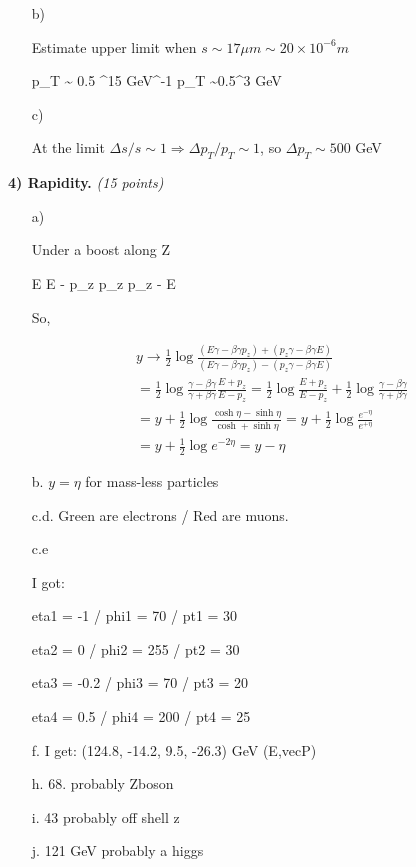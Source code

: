 {\begin{itemize}
{}

\item[b)]{
Estimate upper limit when $s\sim17 \mu m \sim 20 \times 10^{-6} m$

\be
p_T \sim {}  0.5  ^{15} GeV^{-1}
p_T \sim 0.5^3 GeV
\ee

}
\item[c)]{
At the limit $\Delta s / s \sim 1  \Rightarrow \Delta p_T / p_T \sim 1 $, so $\Delta p_T \sim 500$ GeV


}
\end{itemize}

\vspace*{0.25in}

\textbf{4) Rapidity.} \hfill \textit{(15 points)}\\

\begin{itemize}
\item[a)]{
Under a boost along Z

\be
E \rightarrow E \gamma - \beta \gamma p_z
\ee
\be
p_z \rightarrow p_z \gamma - \beta \gamma E
\ee

So,

\begin{align*}
y \rightarrow \frac{1}{2} \log \frac{(E \gamma - \beta \gamma p_z) + (p_z \gamma - \beta \gamma E)}{(E \gamma - \beta \gamma p_z) -(p_z \gamma - \beta \gamma E)} \\ 
  = \frac{1}{2} \log \frac{\gamma - \beta \gamma}{\gamma + \beta \gamma}\frac{E+p_z}{E - p_z} = \frac{1}{2} \log \frac{E+p_z}{E - p_z} + \frac{1}{2} \log \frac{\gamma - \beta \gamma}{\gamma + \beta \gamma}\\
  = y + \frac{1}{2} \log \frac{\cosh \eta - \sinh \eta}{\cosh + \sinh \eta} = y + \frac{1}{2} \log \frac{e^{-\eta}} {e^{+\eta}}\\
  = y + \frac{1}{2} \log e^{-2\eta} = y - \eta
 \end{align*}

}
\item[b.]{
$y = \eta $ for mass-less particles
}
\item[c.d.]{
Green are electrons / Red are muons.
}
\item[c.e]{
I got:

eta1 = -1  /
phi1 = 70 /
pt1  = 30 

eta2 = 0  /
phi2 = 255 /
pt2  = 30 

eta3 = -0.2 / 
phi3 = 70  /
pt3  = 20

eta4 = 0.5 / 
phi4 = 200 /
pt4  = 25 

}
\item[f.]{
I get: (124.8, -14.2, 9.5, -26.3) GeV (E,vec{P})
}
\item[h.]{68. probably Zboson}
\item[i.]{43 probably off shell z}
\item[j.]{121 GeV probably a higgs}





\end{itemize}




}

